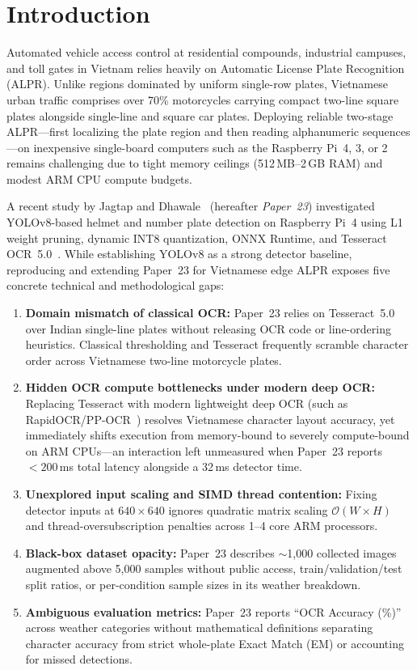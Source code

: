 \documentclass[pdflatex,sn-mathphys-num]{sn-jnl}
\begin{document}
\section{Introduction}\label{sec:intro}

Automated vehicle access control at residential compounds, industrial campuses, and toll gates in Vietnam relies heavily on Automatic License Plate Recognition (ALPR). Unlike regions dominated by uniform single-row plates, Vietnamese urban traffic comprises over 70\% motorcycles carrying compact two-line square plates alongside single-line and square car plates. Deploying reliable two-stage ALPR---first localizing the plate region and then reading alphanumeric sequences---on inexpensive single-board computers such as the Raspberry Pi~4, 3, or 2 remains challenging due to tight memory ceilings (512\,MB--2\,GB RAM) and modest ARM CPU compute budgets.

A recent study by Jagtap and Dhawale~\cite{jagtap2025yolo} (hereafter \emph{Paper~23}) investigated YOLOv8-based helmet and number plate detection on Raspberry Pi~4 using L1 weight pruning, dynamic INT8 quantization, ONNX Runtime, and Tesseract OCR~5.0~\cite{smith2007tesseract}. While establishing YOLOv8 as a strong detector baseline, reproducing and extending Paper~23 for Vietnamese edge ALPR exposes five concrete technical and methodological gaps:
\begin{enumerate}
    \item \textbf{Domain mismatch of classical OCR:} Paper~23 relies on Tesseract~5.0 over Indian single-line plates without releasing OCR code or line-ordering heuristics. Classical thresholding and Tesseract frequently scramble character order across Vietnamese two-line motorcycle plates.
    \item \textbf{Hidden OCR compute bottlenecks under modern deep OCR:} Replacing Tesseract with modern lightweight deep OCR (such as RapidOCR/PP-OCR~\cite{liao2020real,li2022ppocrv3}) resolves Vietnamese character layout accuracy, yet immediately shifts execution from memory-bound to severely compute-bound on ARM CPUs---an interaction left unmeasured when Paper~23 reports $<200$\,ms total latency alongside a 32\,ms detector time.
    \item \textbf{Unexplored input scaling and SIMD thread contention:} Fixing detector inputs at $640\times 640$ ignores quadratic matrix scaling $\mathcal{O}(W\times H)$ and thread-oversubscription penalties across 1--4 core ARM processors.
    \item \textbf{Black-box dataset opacity:} Paper~23 describes $\sim$1,000 collected images augmented above 5,000 samples without public access, train/validation/test split ratios, or per-condition sample sizes in its weather breakdown.
    \item \textbf{Ambiguous evaluation metrics:} Paper~23 reports ``OCR Accuracy (\%)'' across weather categories without mathematical definitions separating character accuracy from strict whole-plate Exact Match (EM) or accounting for missed detections.
\end{enumerate}
\end{document}
